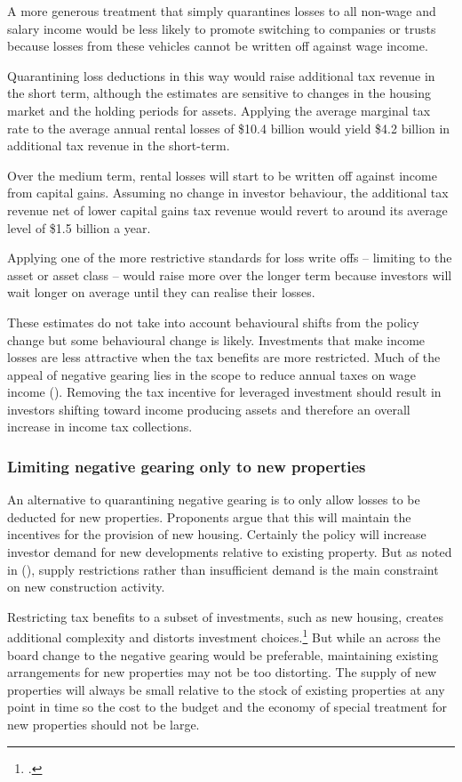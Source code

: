\documentclass{grattan}\usepackage[]{graphicx}\usepackage[]{color}
\begin{document}
A more generous treatment that simply quarantines losses to all non-wage and salary income would be less likely to promote switching to companies or trusts because losses from these vehicles cannot be written off against wage income.

Quarantining loss deductions in this way would raise additional tax revenue in the short term, although the estimates are sensitive to changes in the housing market and the holding periods for assets. Applying the average marginal tax rate to the average annual rental losses of \$10.4 billion would yield \$4.2 billion in additional tax revenue in the short-term. 

Over the medium term, rental losses will start to be written off against income from capital gains. Assuming no change in investor behaviour, the additional tax revenue net of lower capital gains tax revenue would revert to around its average level of \$1.5 billion a year. 

Applying one of the more restrictive standards for loss write offs -- limiting to the asset or asset class -- would raise more over the longer term because investors will wait longer on average until they can realise their losses. 

These estimates do not take into account behavioural shifts from the policy change but some behavioural change is likely. Investments that make income losses are less attractive when the tax benefits are more restricted. Much of the appeal of negative gearing lies in the scope to reduce annual taxes on wage income (). Removing the tax incentive for leveraged investment should result in investors shifting toward income producing assets and therefore an overall increase in income tax collections.  
\subsubsection{Limiting negative gearing only to new properties}
An alternative to quarantining negative gearing is to only allow losses to be deducted for new properties. 
Proponents argue that this will maintain the incentives for the provision of new housing.  Certainly the policy will increase investor demand for new developments relative to existing property. But as noted in (), supply restrictions rather than insufficient demand is the main constraint on new construction activity. 

Restricting tax benefits to a subset of investments, such as new housing, creates additional complexity and distorts investment choices.\footcite[p.~28]{McKell}  But while an across the board change to the negative gearing would be preferable, maintaining existing arrangements for new properties may not be too distorting. The supply of new properties will always be small relative to the stock of existing properties at any point in time  so the cost to the budget and the economy of special treatment for new properties should not be large. 
\end{document}
